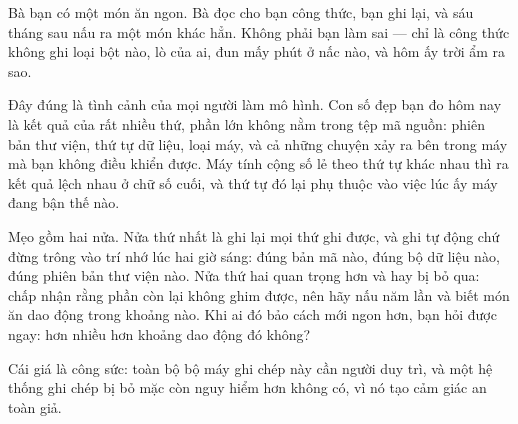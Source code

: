 \documentclass[../../deep_learning.tex]{subfiles}
\begin{document}
\begin{traloi}
\end{traloi}

\begin{dongian}
Bà bạn có một món ăn ngon. Bà đọc cho bạn công thức, bạn ghi lại, và sáu tháng sau nấu ra một món khác hẳn. Không phải bạn làm sai --- chỉ là công thức không ghi loại bột nào, lò của ai, đun mấy phút ở nấc nào, và hôm ấy trời ẩm ra sao.

Đây đúng là tình cảnh của mọi người làm mô hình. Con số đẹp bạn đo hôm nay là kết quả của rất nhiều thứ, phần lớn không nằm trong tệp mã nguồn: phiên bản thư viện, thứ tự dữ liệu, loại máy, và cả những chuyện xảy ra bên trong máy mà bạn không điều khiển được. Máy tính cộng số lẻ theo thứ tự khác nhau thì ra kết quả lệch nhau ở chữ số cuối, và thứ tự đó lại phụ thuộc vào việc lúc ấy máy đang bận thế nào.

Mẹo gồm hai nửa. Nửa thứ nhất là ghi lại mọi thứ ghi được, và ghi tự động chứ đừng trông vào trí nhớ lúc hai giờ sáng: đúng bản mã nào, đúng bộ dữ liệu nào, đúng phiên bản thư viện nào. Nửa thứ hai quan trọng hơn và hay bị bỏ qua: chấp nhận rằng phần còn lại không ghim được, nên hãy nấu năm lần và biết món ăn dao động trong khoảng nào. Khi ai đó bảo cách mới ngon hơn, bạn hỏi được ngay: hơn nhiều hơn khoảng dao động đó không?

Cái giá là công sức: toàn bộ bộ máy ghi chép này cần người duy trì, và một hệ thống ghi chép bị bỏ mặc còn nguy hiểm hơn không có, vì nó tạo cảm giác an toàn giả.

\end{dongian}
\end{document}
